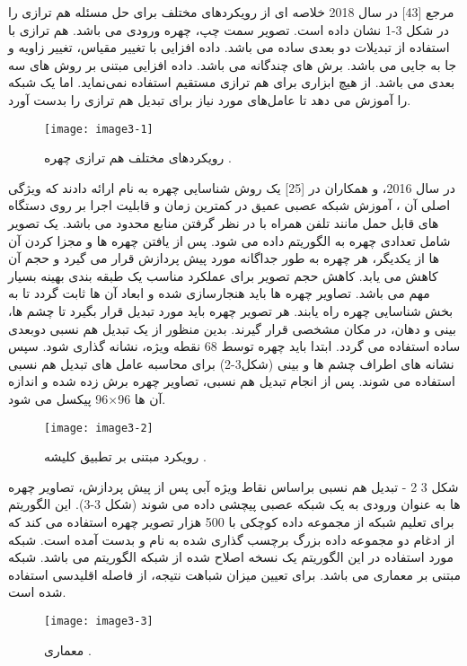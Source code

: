 مرجع [43] در سال 2018 خلاصه ای از رویکردهای مختلف برای حل مسئله هم ترازی را در شکل 3-1 نشان داده است. تصویر سمت چپ، چهره ورودی می باشد.  هم ترازی با استفاده از تبدیلات دو بعدی ساده می باشد.  داده افزایی با تغییر مقیاس، تغییر زاویه و جا به جایی می باشد.  برش های چندگانه می باشد.  داده افزایی مبتنی بر روش های سه بعدی می باشد.  از هیچ ابزاری برای هم ترازی مستقیم استفاده نمی‌نماید. اما یک شبکه را آموزش می دهد تا عامل‌های مورد نیاز برای تبدیل هم ترازی را بدست آورد.
\begin{figure}[h]
\centering
  \texttt{[image: image3-1]}
  \caption{رویکردهای مختلف هم ترازی چهره \cite{ref1}.}
  \label{image2-1}
\end{figure}

\noindent
در سال 2016،  و همکاران در [25] یک روش شناسایی چهره به نام  ارائه دادند که ویژگی اصلی آن ، آموزش شبکه عصبی عمیق در کمترین زمان و قابلیت اجرا بر روی دستگاه های قابل حمل مانند تلفن همراه با در نظر گرفتن منابع محدود می باشد. یک تصویر شامل تعدادی چهره به الگوریتم داده می شود. پس از یافتن چهره ها و مجزا کردن  آن ها از یکدیگر، هر چهره به طور جداگانه مورد پیش پردازش  قرار می گیرد و حجم آن کاهش می یابد. کاهش حجم تصویر برای عملکرد مناسب یک طبقه بندی بهینه بسیار مهم می باشد. تصاویر چهره ها باید هنجارسازی شده و ابعاد آن ها ثابت گردد تا به بخش شناسایی چهره راه یابند.
هر تصویر چهره باید مورد تبدیل قرار بگیرد تا چشم ها، بینی و دهان، در مکان مشخصی قرار گیرند. بدین منظور از یک تبدیل هم نسبی  دوبعدی ساده استفاده می گردد. ابتدا باید چهره توسط 68 نقطه ویژه، نشانه گذاری شود. سپس نشانه های اطراف چشم ها و بینی (شکل3-2) برای محاسبه عامل های تبدیل هم نسبی استفاده می شوند. پس از انجام تبدیل هم نسبی، تصاویر چهره برش زده شده و اندازه آن ها 96×96 پیکسل می شود.
 \begin{figure}[h]
\centering
  \texttt{[image: image3-2]}
  \caption{رویکرد مبتنی بر تطبیق کلیشه  \cite{ref1}.}
  \label{image2-1}
\end{figure}
شکل ‏3 2 - تبدیل هم نسبی  براساس نقاط ویژه آبی 
پس از پیش پردازش، تصاویر چهره ها به عنوان ورودی به یک شبکه عصبی پیچشی داده می شوند (شکل 3-3). این الگوریتم برای تعلیم شبکه از مجموعه داده کوچکی با 500 هزار تصویر چهره استفاده می کند که از ادغام دو مجموعه داده بزرگ برچسب گذاری شده به نام  و  بدست آمده است. شبکه مورد استفاده در این الگوریتم یک نسخه اصلاح شده از شبکه  الگوریتم  می باشد. شبکه  مبتنی بر معماری  می باشد. برای تعیین میزان شباهت نتیجه، از فاصله اقلیدسی استفاده شده است.
 \begin{figure}[h]
\centering
  \texttt{[image: image3-3]}
  \caption{معماری   \cite{ref1}.}
  \label{image2-1}
\end{figure}
